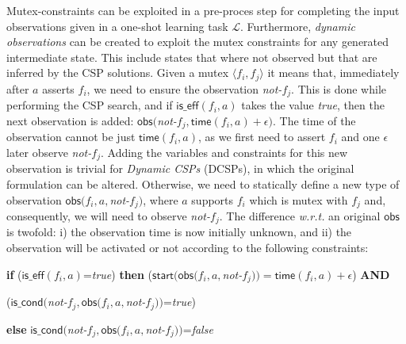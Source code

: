 \documentclass{ecai}
\newcommand{\tup}[1]{{\langle #1 \rangle}}
\newcommand{\iscond}{\mathsf{is\_cond}}    %
\newcommand{\iseff}{\mathsf{is\_eff}}    %
\newcommand{\obs}{\mathsf{obs}}    %
\newcommand{\start}{\mathsf{start}}%
\newcommand{\tim}{\mathsf{time}}   %
\begin{document}
Mutex-constraints can be exploited in a pre-proces step for completing the input observations given in a one-shot learning task $\mathcal{L}$. Furthermore, {\em dynamic observations} can be created to exploit the mutex constraints for any generated intermediate state. This include states that where not observed but that are inferred by the CSP solutions. Given a mutex $\tup{f_i, f_j}$ it means that, immediately after $a$ asserts $f_i$, we need to ensure the observation \textit{not-}$f_j$. This is done while performing the CSP search, and if $\iseff(f_i,a)$ takes the value \textit{true}, then the next observation is added: $\obs($\textit{not-}$f_j,\tim(f_i,a)+\epsilon)$. The time of the observation cannot be just $\tim(f_i,a)$, as we first need to assert $f_i$ and one $\epsilon$ later observe \textit{not-}$f_j$. Adding the variables and constraints for this new observation is trivial for {\em Dynamic CSPs} (DCSPs), in which the original formulation can be altered. Otherwise, we need to statically define a new type of observation $\obs(f_i,a,$\textit{not-}$f_j)$, where $a$ supports $f_i$ which is mutex with $f_j$ and, consequently, we will need to observe \textit{not-}$f_j$. The difference \textit{w.r.t.} an original $\obs$ is twofold: i) the observation time is now initially unknown, and ii) the observation will be activated or not according to the following constraints:
\newline

{\scriptsize 
\textbf{if} ($\iseff(f_i,a)$=\textit{true}) \textbf{then} ($\start(\obs(f_i,a,$\textit{not-}$f_j))=\tim(f_i,a)+\epsilon$) \textbf{AND}

\hspace{2.83cm}($\iscond($\textit{not-}$f_j,\obs(f_i,a,$\textit{not-}$f_j))$=\textit{true})

\textbf{else} $\iscond($\textit{not-}$f_j,\obs(f_i,a,$\textit{not-}$f_j))$=\textit{false}
}



\end{document}
